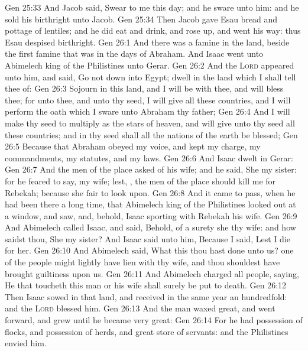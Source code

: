 \vs Gen 25:33 And Jacob said, Swear to me this day; and he sware unto him: and he sold his birthright unto Jacob.
\vs Gen 25:34 Then Jacob gave Esau bread and pottage of lentiles; and he did eat and drink, and rose up, and went his way: thus Esau despised  birthright.
\vs Gen 26:1 And there was a famine in the land, beside the first famine that was in the days of Abraham. And Isaac went unto Abimelech king of the Philistines unto Gerar.
\vs Gen 26:2 And the \textsc{Lord} appeared unto him, and said, Go not down into Egypt; dwell in the land which I shall tell thee of:
\vs Gen 26:3 Sojourn in this land, and I will be with thee, and will bless thee; for unto thee, and unto thy seed, I will give all these countries, and I will perform the oath which I sware unto Abraham thy father;
\vs Gen 26:4 And I will make thy seed to multiply as the stars of heaven, and will give unto thy seed all these countries; and in thy seed shall all the nations of the earth be blessed;
\vs Gen 26:5 Because that Abraham obeyed my voice, and kept my charge, my commandments, my statutes, and my laws.
\vs Gen 26:6 And Isaac dwelt in Gerar:
\vs Gen 26:7 And the men of the place asked  of his wife; and he said, She  my sister: for he feared to say,  my wife; lest, , the men of the place should kill me for Rebekah; because she  fair to look upon.
\vs Gen 26:8 And it came to pass, when he had been there a long time, that Abimelech king of the Philistines looked out at a window, and saw, and, behold, Isaac  sporting with Rebekah his wife.
\vs Gen 26:9 And Abimelech called Isaac, and said, Behold, of a surety she  thy wife: and how saidst thou, She  my sister? And Isaac said unto him, Because I said, Lest I die for her.
\vs Gen 26:10 And Abimelech said, What  this thou hast done unto us? one of the people might lightly have lien with thy wife, and thou shouldest have brought guiltiness upon us.
\vs Gen 26:11 And Abimelech charged all  people, saying, He that toucheth this man or his wife shall surely be put to death.
\vs Gen 26:12 Then Isaac sowed in that land, and received in the same year an hundredfold: and the \textsc{Lord} blessed him.
\vs Gen 26:13 And the man waxed great, and went forward, and grew until he became very great:
\vs Gen 26:14 For he had possession of flocks, and possession of herds, and great store of servants: and the Philistines envied him.
